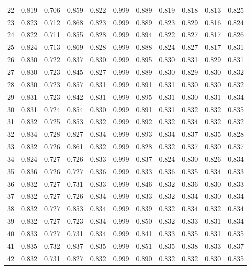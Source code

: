 \begin{longtable}[p]{|c|c|c|c|c|c|c|c|c|c|c|}
	22 & 0.819 & 0.706 & 0.859 & 0.822 & 0.999 & 0.889 & 0.819 & 0.818 & 0.813 & 0.825\\
	23 & 0.823 & 0.712 & 0.868 & 0.823 & 0.999 & 0.889 & 0.823 & 0.829 & 0.816 & 0.824\\
	24 & 0.822 & 0.711 & 0.855 & 0.828 & 0.999 & 0.894 & 0.822 & 0.827 & 0.817 & 0.826\\
	25 & 0.824 & 0.713 & 0.869 & 0.828 & 0.999 & 0.888 & 0.824 & 0.827 & 0.817 & 0.831\\
	26 & 0.830 & 0.722 & 0.837 & 0.830 & 0.999 & 0.895 & 0.830 & 0.831 & 0.829 & 0.831\\
	27 & 0.830 & 0.723 & 0.845 & 0.827 & 0.999 & 0.889 & 0.830 & 0.829 & 0.830 & 0.832\\
	28 & 0.830 & 0.723 & 0.857 & 0.831 & 0.999 & 0.891 & 0.831 & 0.830 & 0.830 & 0.832\\
	29 & 0.831 & 0.723 & 0.842 & 0.831 & 0.999 & 0.895 & 0.831 & 0.830 & 0.831 & 0.834\\
	30 & 0.831 & 0.724 & 0.854 & 0.830 & 0.999 & 0.891 & 0.831 & 0.832 & 0.832 & 0.835\\
	31 & 0.832 & 0.725 & 0.853 & 0.832 & 0.999 & 0.892 & 0.832 & 0.834 & 0.832 & 0.832\\
	32 & 0.834 & 0.728 & 0.827 & 0.834 & 0.999 & 0.893 & 0.834 & 0.837 & 0.835 & 0.828\\
	33 & 0.832 & 0.726 & 0.861 & 0.832 & 0.999 & 0.828 & 0.832 & 0.837 & 0.830 & 0.837\\
	34 & 0.824 & 0.727 & 0.726 & 0.833 & 0.999 & 0.837 & 0.824 & 0.830 & 0.826 & 0.834\\
	35 & 0.836 & 0.726 & 0.727 & 0.836 & 0.999 & 0.833 & 0.836 & 0.835 & 0.834 & 0.833\\
	36 & 0.832 & 0.727 & 0.731 & 0.833 & 0.999 & 0.846 & 0.832 & 0.836 & 0.830 & 0.833\\
	37 & 0.832 & 0.727 & 0.726 & 0.834 & 0.999 & 0.833 & 0.832 & 0.834 & 0.830 & 0.834\\
	38 & 0.832 & 0.727 & 0.853 & 0.834 & 0.999 & 0.839 & 0.832 & 0.834 & 0.832 &0.834 \\
	39 & 0.832 & 0.727 & 0.723 & 0.834 & 0.999 & 0.850 & 0.832 & 0.833 & 0.831& 0.834 \\
	40 & 0.833 & 0.727 & 0.731 & 0.834 & 0.999 & 0.841 & 0.833 & 0.835 & 0.831 & 0.835\\
	41 & 0.835 & 0.732 & 0.837 & 0.835 & 0.999 & 0.851 & 0.835 & 0.838 & 0.833 & 0.837\\
	42 & 0.832 & 0.731 & 0.827 & 0.832 & 0.999 & 0.890 & 0.832 & 0.832 & 0.830 & 0.835\\

\end{longtable}

